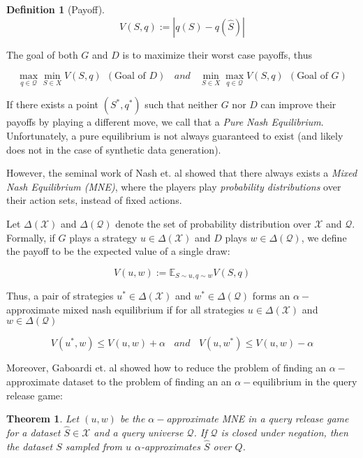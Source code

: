 \documentclass[]{article}
\newcommand{\X}{\mathcal{X}}
\newcommand{\Q}{\mathcal{Q}}
\newtheorem{definition}{Definition}
\newtheorem{theorem}{Theorem}
\begin{document}
\begin{definition}[Payoff]
    \begin{equation}
        V(S,q) := |q(S) - q(\hat S)|
    \end{equation}
\end{definition}

The goal of both $G$ and $D$ is to maximize their worst case payoffs, thus

\begin{equation}
    \max_{q \in \Q} \min_{S \in X} V(S,q) ~~ (\text{Goal of } D) ~~~~ and ~~~~ 
    \min_{S \in X} \max_{q \in \Q} V(S,q) ~~ (\text{Goal of } G) 
\end{equation}

If there exists a point $(S^*, q^*)$ such that neither $G$ nor $D$ can improve their payoffs by playing a different move, we call that a \emph{Pure Nash Equilibrium}. Unfortunately, a pure equilibrium is not always guaranteed to exist (and likely does not in the case of synthetic data generation). 

However, the seminal work of Nash et. al showed that there always exists a \emph{Mixed Nash Equilibrium (MNE)}, where the players play \emph{probability distributions} over their action sets, instead of fixed actions. 

Let $\Delta(\X)$ and $\Delta(\Q)$ denote the set of probability distribution over $\X$ and $\Q$. Formally, if $G$ plays a strategy $u \in \Delta(\X)$ and $D$ plays  $w \in \Delta(\Q)$, we define the payoff to be the expected value of a single draw:

\begin{equation}
    V(u,w) := \mathbb{E}_{S \sim u, q \sim w} V(S,q)
\end{equation}

Thus, a pair of strategies $u^* \in \Delta(\X)$ and $w^* \in \Delta(\Q)$ forms an $\alpha-$approximate mixed nash equilibrium if for all strategies $u \in \Delta(\X)$ and $w \in \Delta(\Q)$

\begin{equation}
    V(u^*, w) \leq V(u,w) + \alpha ~~~~ and ~~~~ V(u, w^*) \leq V(u,w) - \alpha 
\end{equation}

Moreover, Gaboardi et. al showed how to reduce the problem of finding an $\alpha-$approximate dataset to the problem of finding an an $\alpha-$equilibrium in the query release game:

\begin{theorem}
    Let $(u,w)$ be the $\alpha-$approximate MNE in a query release game for a dataset $\hat S \in \X$ and a query universe $\Q$. If $\Q$ is closed under negation, then the dataset $S$ sampled from $u$ $\alpha$-approximates $\hat S$ over $Q$. \cite{GAH+14}
\end{theorem}
\end{document}
